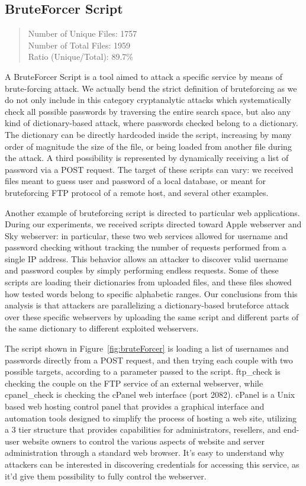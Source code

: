 \subsection{BruteForcer Script}

\begin{quote}
Number of Unique Files: 1757\\
Number of Total Files: 1959\\
Ratio (Unique/Total): 89.7\%
\end{quote}

A BruteForcer Script is a tool aimed to attack a specific service by means of brute-forcing attack. We actually bend the strict definition of bruteforcing as we do not only include in this category cryptanalytic attacks which systematically check all possible passwords by traversing the entire search space, but also any kind of dictionary-based attack, where passwords checked belong to a dictionary. The dictionary can be directly hardcoded inside the script, increasing by many order of magnitude the size of the file, or being loaded from another file during the attack. A third possibility is represented by dynamically receiving a list of password via a POST request. The target of these scripts can vary: we received files meant to guess user and password of a local database, or meant for bruteforcing FTP protocol of a remote host, and several other examples.

Another example of bruteforcing script is directed to particular web applications. During our experiments, we received scripts directed toward Apple webserver and Sky webserver: in particular, these two web services allowed for username and password checking without tracking the number of requests performed from a single IP address. This behavior allows an attacker to discover valid username and password couples by simply performing endless requests. Some of these scripts are loading their dictionaries from uploaded files, and these files showed how tested words belong to specific alphabetic ranges. Our conclusions from this analysis is that attackers are parallelizing a dictionary-based bruteforce attack over these specific webservers by uploading the same script and different parts of the same dictionary to different exploited webservers.

The script shown in Figure~\ref{fig:bruteForcer} is loading a list of usernames and passwords directly from a POST request, and then trying each couple with two possible targets, according to a parameter passed to the script. ftp\_check is checking the couple on the FTP service of an external webserver, while cpanel\_check is checking the cPanel web interface (port 2082). cPanel is a Unix based web hosting control panel that provides a graphical interface and automation tools designed to simplify the process of hosting a web site, utilizing a 3 tier structure that provides capabilities for administrators, resellers, and end-user website owners to control the various aspects of website and server administration through a standard web browser. It's easy to understand why attackers can be interested in discovering credentials for accessing this service, as it'd give them possibility to fully control the webserver.

